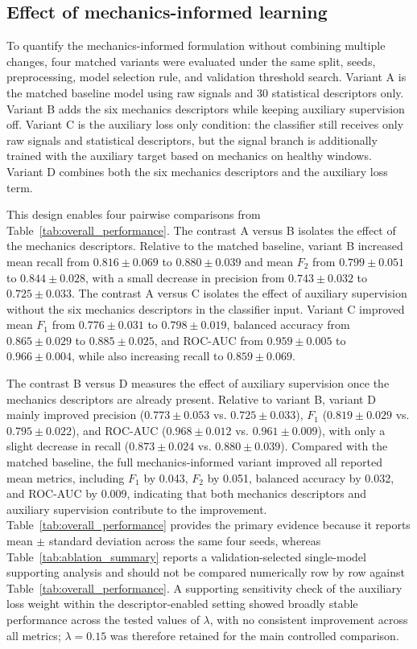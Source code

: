 \documentclass[fleqn,10pt]{wlscirep}
\begin{document}
\FloatBarrier

\subsection*{Effect of mechanics-informed learning}

To quantify the mechanics-informed formulation without combining multiple changes, four matched variants were evaluated under the same split, seeds, preprocessing, model selection rule, and validation threshold search. Variant A is the matched baseline model using raw signals and 30 statistical descriptors only. Variant B adds the six mechanics descriptors while keeping auxiliary supervision off. Variant C is the auxiliary loss only condition: the classifier still receives only raw signals and statistical descriptors, but the signal branch is additionally trained with the auxiliary target based on mechanics on healthy windows. Variant D combines both the six mechanics descriptors and the auxiliary loss term.

This design enables four pairwise comparisons from Table~\ref{tab:overall_performance}. The contrast A versus B isolates the effect of the mechanics descriptors. Relative to the matched baseline, variant B increased mean recall from $0.816 \pm 0.069$ to $0.880 \pm 0.039$ and mean $F_2$ from $0.799 \pm 0.051$ to $0.844 \pm 0.028$, with a small decrease in precision from $0.743 \pm 0.032$ to $0.725 \pm 0.033$. The contrast A versus C isolates the effect of auxiliary supervision without the six mechanics descriptors in the classifier input. Variant C improved mean $F_1$ from $0.776 \pm 0.031$ to $0.798 \pm 0.019$, balanced accuracy from $0.865 \pm 0.029$ to $0.885 \pm 0.025$, and ROC-AUC from $0.959 \pm 0.005$ to $0.966 \pm 0.004$, while also increasing recall to $0.859 \pm 0.069$.

The contrast B versus D measures the effect of auxiliary supervision once the mechanics descriptors are already present. Relative to variant B, variant D mainly improved precision ($0.773 \pm 0.053$ vs. $0.725 \pm 0.033$), $F_1$ ($0.819 \pm 0.029$ vs. $0.795 \pm 0.022$), and ROC-AUC ($0.968 \pm 0.012$ vs. $0.961 \pm 0.009$), with only a slight decrease in recall ($0.873 \pm 0.024$ vs. $0.880 \pm 0.039$). Compared with the matched baseline, the full mechanics-informed variant improved all reported mean metrics, including $F_1$ by 0.043, $F_2$ by 0.051, balanced accuracy by 0.032, and ROC-AUC by 0.009, indicating that both mechanics descriptors and auxiliary supervision contribute to the improvement. Table~\ref{tab:overall_performance} provides the primary evidence because it reports mean $\pm$ standard deviation across the same four seeds, whereas Table~\ref{tab:ablation_summary} reports a validation-selected single-model supporting analysis and should not be compared numerically row by row against Table~\ref{tab:overall_performance}. A supporting sensitivity check of the auxiliary loss weight within the descriptor-enabled setting showed broadly stable performance across the tested values of $\lambda$, with no consistent improvement across all metrics; $\lambda = 0.15$ was therefore retained for the main controlled comparison.
\end{document}
